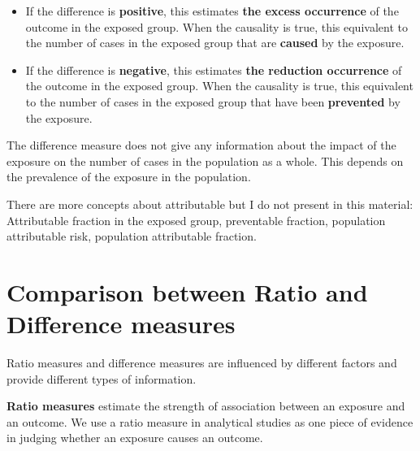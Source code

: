 \documentclass[
  letterpaper,
  DIV=11,
  numbers=noendperiod]{scrreprt}
\begin{document}
\begin{itemize}
\item
  If the difference is \textbf{positive}, this estimates \textbf{the
  excess occurrence} of the outcome in the exposed group. When the
  causality is true, this equivalent to the number of cases in the
  exposed group that are \textbf{caused} by the exposure.
\item
  If the difference is \textbf{negative}, this estimates \textbf{the
  reduction occurrence} of the outcome in the exposed group. When the
  causality is true, this equivalent to the number of cases in the
  exposed group that have been \textbf{prevented} by the exposure.
\end{itemize}

\begin{tcolorbox}[enhanced jigsaw, bottomtitle=1mm, breakable, colframe=quarto-callout-important-color-frame, leftrule=.75mm, opacityback=0, opacitybacktitle=0.6, left=2mm, colbacktitle=quarto-callout-important-color!10!white, coltitle=black, rightrule=.15mm, toptitle=1mm, colback=white, titlerule=0mm, title=\textcolor{quarto-callout-important-color}{\faExclamation}\hspace{0.5em}{Important}, arc=.35mm, bottomrule=.15mm, toprule=.15mm]

The difference measure does not give any information about the impact of
the exposure on the number of cases in the population as a whole. This
depends on the prevalence of the exposure in the population.

There are more concepts about attributable but I do not present in this
material: Attributable fraction in the exposed group, preventable
fraction, population attributable risk, population attributable
fraction.

\end{tcolorbox}

\hypertarget{comparison-between-ratio-and-difference-measures}{%
\section{Comparison between Ratio and Difference
measures}\label{comparison-between-ratio-and-difference-measures}}

Ratio measures and difference measures are influenced by different
factors and provide different types of information.

\textbf{Ratio measures} estimate the strength of association between an
exposure and an outcome. We use a ratio measure in analytical studies as
one piece of evidence in judging whether an exposure causes an outcome.
\end{document}
